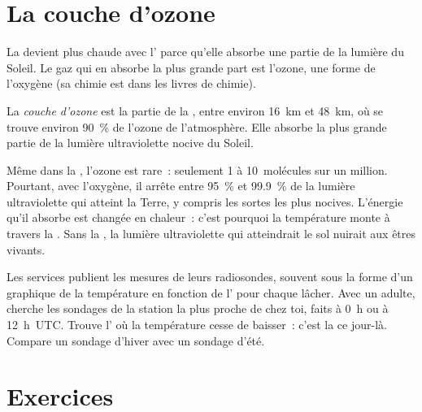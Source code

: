 \section{La couche d'ozone}

La  devient plus chaude avec l' parce qu'elle absorbe
une partie de la lumière du Soleil. Le gaz qui en absorbe la plus grande
part est l'ozone, une forme de l'oxygène (sa chimie est dans les livres de
chimie).

\begin{definition}\label{def:g8:the-atmosphere:ozone-layer}
La \emph{couche d'ozone} est la partie de la
, entre environ \qty{16}{km} et \qty{48}{km}, où se trouve
environ 90~\% de l'ozone de l'atmosphère. Elle absorbe la plus grande
partie de la lumière ultraviolette nocive du Soleil.
\end{definition}

Même dans la , l'ozone est rare~: seulement 1 à
10~molécules sur un million. Pourtant, avec l'oxygène, il arrête entre
95~\% et 99.9~\% de la lumière ultraviolette qui atteint la Terre, y
compris les sortes les plus nocives. L'énergie qu'il absorbe est changée
en chaleur~: c'est pourquoi la température monte à travers la
. Sans la , la lumière ultraviolette qui
atteindrait le sol nuirait aux êtres vivants.

\begin{inthefield}
Les services  publient les mesures de leurs radiosondes,
souvent sous la forme d'un graphique de la température en fonction de
l' pour chaque lâcher. Avec un adulte, cherche les sondages de la
station la plus proche de chez toi, faits à 0~h ou à 12~h~UTC. Trouve
l' où la température cesse de baisser~: c'est la  ce
jour-là. Compare un sondage d'hiver avec un sondage d'été.
\end{inthefield}

\section{Exercices}

